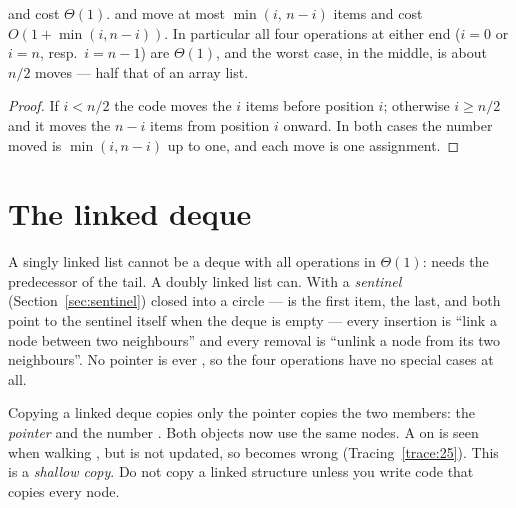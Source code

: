 
\begin{theorem}
 and  cost $\Theta(1)$.  and  move at most
$\min(i,\,n-i)$ items and cost $O(1+\min(i,n-i))$. In particular all four operations at
either end ($i=0$ or $i=n$, resp.\ $i=n-1$) are $\Theta(1)$, and the worst case, in the
middle, is about $n/2$ moves --- half that of an array list.
\end{theorem}
\begin{proof}
If $i<n/2$ the code moves the $i$ items before position $i$; otherwise $i\ge n/2$ and it
moves the $n-i$ items from position $i$ onward. In both cases the number moved is
$\min(i,n-i)$ up to one, and each move is one assignment.
\end{proof}

\section{The linked deque}

A singly linked list cannot be a deque with all operations in $\Theta(1)$: 
needs the predecessor of the tail. A doubly linked list can. With a \emph{sentinel}
(Section~\ref{sec:sentinel}) closed into a circle ---  is the first
item,  the last, and both point to the sentinel itself when the deque
is empty --- every insertion is ``link a node between two neighbours'' and every removal
is ``unlink a node from its two neighbours''. No pointer is ever , so the four
operations have no special cases at all.


\begin{note}{Copying a linked deque copies only the pointer}
 copies the two members: the \emph{pointer}  and the
number . Both objects now use the same nodes. A  on  is seen
when walking , but  is not updated, so  becomes wrong
(Tracing~\ref{trace:25}). This is a \emph{shallow copy}. Do not copy a linked
structure unless you write code that copies every node.
\end{note}

